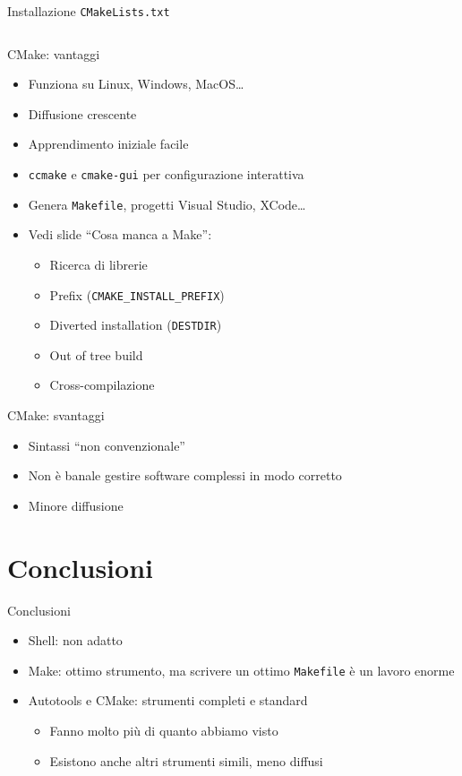 \documentclass[xetex,table]{beamer}
\begin{document}
\begin{frame}{Installazione}
  \texttt{CMakeLists.txt}
  \inputminted[bgcolor=codebackground,frame=single]{cmake}{examples/4-cmake-2/CMakeLists.txt}
\end{frame}

\begin{frame}{CMake: vantaggi}
  \begin{itemize}

  \item Funziona su Linux, Windows, MacOS\dots
  \item Diffusione crescente
  \item Apprendimento iniziale facile
  \item \texttt{ccmake} e \texttt{cmake-gui} per configurazione interattiva
  \item Genera \texttt{Makefile}, progetti Visual Studio, XCode\dots

  \item Vedi slide ``Cosa manca a Make'':
    \begin{itemize}
    \item Ricerca di librerie
    \item Prefix (\texttt{CMAKE\_INSTALL\_PREFIX})
    \item Diverted installation (\texttt{DESTDIR})
    \item Out of tree build
    \item Cross-compilazione
    \end{itemize}

  \end{itemize}
\end{frame}

\begin{frame}{CMake: svantaggi}
  \begin{itemize}
  \item Sintassi ``non convenzionale''
  \item Non è banale gestire software complessi in modo corretto
  \item Minore diffusione
  \end{itemize}
\end{frame}

\section{Conclusioni}

\begin{frame}{Conclusioni}
  \begin{itemize}
  \item Shell: non adatto
  \item Make: ottimo strumento, ma scrivere un ottimo
    \texttt{Makefile} è un lavoro enorme
  \item Autotools e CMake: strumenti completi e standard
    \begin{itemize}
    \item Fanno molto più di quanto abbiamo visto
    \item Esistono anche altri strumenti simili, meno diffusi
    \end{itemize}
  \end{itemize}
\end{frame}
\end{document}
